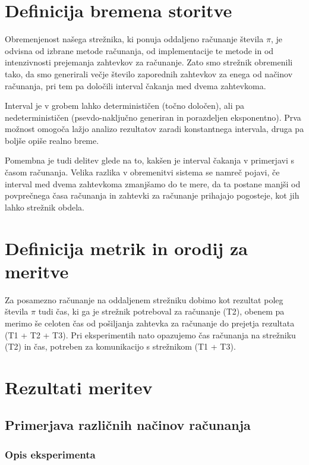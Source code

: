 \section{Definicija bremena storitve} \label{3_breme}

Obremenjenost našega strežnika, ki ponuja oddaljeno računanje števila \(\pi\), je odvisna od izbrane metode računanja, od implementacije te metode in od intenzivnosti prejemanja zahtevkov za računanje.
Zato smo strežnik obremenili tako, da smo generirali večje število zaporednih zahtevkov za enega od načinov računanja, pri tem pa določili interval čakanja med dvema zahtevkoma.

Interval je v grobem lahko determinističen (točno določen), ali pa nedeterminističen (psevdo-naključno generiran in porazdeljen eksponentno).
Prva možnost omogoča lažjo analizo rezultatov zaradi konstantnega intervala, druga pa boljše opiše realno breme.

Pomembna je tudi delitev glede na to, kakšen je interval čakanja v primerjavi s časom računanja.
Velika razlika v obremenitvi sistema se namreč pojavi, če interval med dvema zahtevkoma zmanjšamo do te mere, da ta postane manjši od povprečnega časa računanja in zahtevki za računanje prihajajo pogosteje, kot jih lahko strežnik obdela.



\section{Definicija metrik in orodij za meritve}

Za posamezno računanje na oddaljenem strežniku dobimo kot rezultat poleg števila \(\pi\) tudi čas, ki ga je strežnik potreboval za računanje (T2), obenem pa merimo še celoten čas od pošiljanja zahtevka za računanje do prejetja rezultata (T1 + T2 + T3).
Pri eksperimentih nato opazujemo čas računanja na strežniku (T2) in čas, potreben za komunikacijo s strežnikom (T1 + T3).



\section{Rezultati meritev}

\subsection{Primerjava različnih načinov računanja}

\subsubsection{Opis eksperimenta}
    

